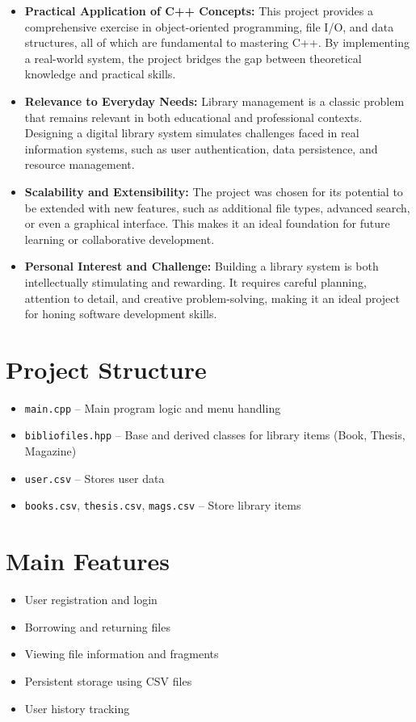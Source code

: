 \documentclass[a4paper,12pt]{article}
\begin{document}
\begin{itemize}
    \item \textbf{Practical Application of C++ Concepts:} This project provides a comprehensive exercise in object-oriented programming, file I/O, and data structures, all of which are fundamental to mastering C++. By implementing a real-world system, the project bridges the gap between theoretical knowledge and practical skills.
    \item \textbf{Relevance to Everyday Needs:} Library management is a classic problem that remains relevant in both educational and professional contexts. Designing a digital library system simulates challenges faced in real information systems, such as user authentication, data persistence, and resource management.
    \item \textbf{Scalability and Extensibility:} The project was chosen for its potential to be extended with new features, such as additional file types, advanced search, or even a graphical interface. This makes it an ideal foundation for future learning or collaborative development.
    \item \textbf{Personal Interest and Challenge:} Building a library system is both intellectually stimulating and rewarding. It requires careful planning, attention to detail, and creative problem-solving, making it an ideal project for honing software development skills.
\end{itemize}

\section{Project Structure}
\begin{itemize}
    \item \texttt{main.cpp} -- Main program logic and menu handling
    \item \texttt{bibliofiles.hpp} -- Base and derived classes for library items (Book, Thesis, Magazine)
    \item \texttt{user.csv} -- Stores user data
    \item \texttt{books.csv}, \texttt{thesis.csv}, \texttt{mags.csv} -- Store library items
\end{itemize}

\section{Main Features}
\begin{itemize}
    \item User registration and login
    \item Borrowing and returning files
    \item Viewing file information and fragments
    \item Persistent storage using CSV files
    \item User history tracking
\end{itemize}
\end{document}
